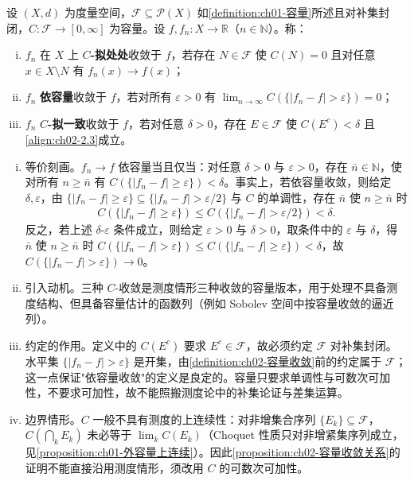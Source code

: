 \documentclass[../../main.tex]{subfiles}%
\begin{document}
\begin{definition}\label{definition:ch02-容量收敛}
设 $(X,d)$ 为度量空间，$\mathscr F\subseteq\mathscr P(X)$ 如\cref{definition:ch01-容量}所述且对补集封闭，$C:\mathscr F\to[0,\infty]$ 为容量。设 $f,f_n:X\to\mathbb{R}$（$n\in\mathbb{N}$）。称：
\begin{enumerate}[(i)]
\item $f_n$ 在 $X$ 上 \textbf{$C$-拟处处}收敛于 $f$，若存在 $N\in\mathscr F$ 使 $C(N)=0$ 且对任意 $x\in X\setminus N$ 有 $f_n(x)\to f(x)$；
\item $f_n$ \textbf{依容量}收敛于 $f$，若对所有 $\varepsilon>0$ 有 $\lim_{n\to\infty}C(\{|f_n-f|>\varepsilon\})=0$；
\item $f_n$ \textbf{$C$-拟一致}收敛于 $f$，若对任意 $\delta>0$，存在 $E\in\mathscr F$ 使 $C(E^c)<\delta$ 且\eqref{align:ch02-2.3}成立。
\end{enumerate}
\end{definition}

\begin{remark}\label{remark:ch02-依容量判据}
\begin{enumerate}[(i)]
\item 等价刻画。$f_n\to f$ 依容量当且仅当：对任意 $\delta>0$ 与 $\varepsilon>0$，存在 $\bar n\in\mathbb{N}$，使对所有 $n\geqslant\bar n$ 有 $C(\{|f_n-f|\geqslant\varepsilon\})<\delta$。事实上，若依容量收敛，则给定 $\delta,\varepsilon$，由 $\{|f_n-f|\geqslant\varepsilon\}\subseteq\{|f_n-f|>\varepsilon/2\}$ 与 $C$ 的单调性，存在 $\bar n$ 使 $n\geqslant\bar n$ 时
\begin{align*}
C(\{|f_n-f|\geqslant\varepsilon\})\leqslant C(\{|f_n-f|>\varepsilon/2\})<\delta.
\end{align*}
反之，若上述 $\delta$-$\varepsilon$ 条件成立，则给定 $\varepsilon>0$ 与 $\delta>0$，取条件中的 $\varepsilon$ 与 $\delta$，得 $\bar n$ 使 $n\geqslant\bar n$ 时 $C(\{|f_n-f|>\varepsilon\})\leqslant C(\{|f_n-f|\geqslant\varepsilon\})<\delta$，故 $C(\{|f_n-f|>\varepsilon\})\to0$。
\item 引入动机。三种 $C$-收敛是测度情形三种收敛的容量版本，用于处理不具备测度结构、但具备容量估计的函数列（例如 Sobolev 空间中按容量收敛的逼近列）。
\item 约定的作用。定义中的 $C(E^c)$ 要求 $E^c\in\mathscr F$，故必须约定 $\mathscr F$ 对补集封闭。水平集 $\{|f_n-f|>\varepsilon\}$ 是开集，由\cref{definition:ch02-容量收敛}前的约定属于 $\mathscr F$；这一点保证"依容量收敛"的定义是良定的。容量只要求单调性与可数次可加性，不要求可加性，故不能照搬测度论中的补集论证与差集运算。
\item 边界情形。$C$ 一般不具有测度的上连续性：对非增集合序列 $\{E_k\}\subseteq\mathscr F$，$C(\bigcap_kE_k)$ 未必等于 $\lim_kC(E_k)$（Choquet 性质只对非增紧集序列成立，见\cref{proposition:ch01-外容量上连续}）。因此\cref{proposition:ch02-容量收敛关系}的证明不能直接沿用测度情形，须改用 $C$ 的可数次可加性。
\end{enumerate}
\end{remark}
\end{document}
